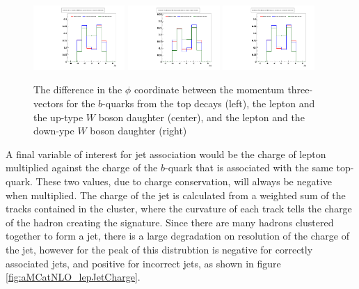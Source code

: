 \begin{figure}[hbtp] 
  {\centering
    \includegraphics[width=0.31\textwidth]{Figures/Analysis_Improvement_Diagrams/tt012jets__h_genParticle_ttbarZMFrame_topsRest_deltaPhi_lepB_hadB__vs__h_recoJets_correctAssoc_ttbarZMFrame_topsRest_deltaPhi_lepB_hadB__vs__h_recoJets_wrongAssoc_ttbarZMFrame_topsRest_deltaPhi_lepB_hadB__unitNorm.pdf}
    \includegraphics[width=0.31\textwidth]{Figures/Analysis_Improvement_Diagrams/tt012jets__h_genParticle_ttbarZMFrame_topsRest_deltaPhi_lep_hadWupQ__vs__h_recoJets_correctAssoc_ttbarZMFrame_topsRest_deltaPhi_lep_hadWupQ__vs__h_recoJets_wrongAssoc_ttbarZMFrame_topsRest_deltaPhi_lep_hadWupQ__unitNorm.pdf}
    \includegraphics[width=0.31\textwidth]{Figures/Analysis_Improvement_Diagrams/tt012jets__h_genParticle_ttbarZMFrame_topsRest_deltaPhi_lepB_hadB__vs__h_recoJets_correctAssoc_ttbarZMFrame_topsRest_deltaPhi_lepB_hadB__vs__h_recoJets_wrongAssoc_ttbarZMFrame_topsRest_deltaPhi_lepB_hadB__unitNorm.pdf}
    \caption{The difference in the $\phi$ coordinate between the momentum
      three-vectors for the $b$-quarks from the top decays (left), the
    lepton and the up-type $W$ boson daughter (center), and the lepton
  and the down-ype $W$ boson daughter (right)}
    \label{fig:aMCatNLO_deltaPhi}}
\end{figure}

\par A final variable of interest for jet association would be the
charge of lepton multiplied against the charge of the $b$-quark that
is associated with the same top-quark.  These two values, due to
charge conservation, will always be negative when multiplied.  The
charge of the jet is calculated from a \PT weighted sum of the tracks
contained in the cluster, where the curvature of each track tells the
charge of the hadron creating the signature.  Since there are many
hadrons clustered together to form a jet, there is a large degradation
on resolution of the charge of the jet, however for the peak of this
distrubtion is negative for correctly associated jets, and positive
for incorrect jets, as shown in figure
\ref{fig:aMCatNLO_lepJetCharge}.  

